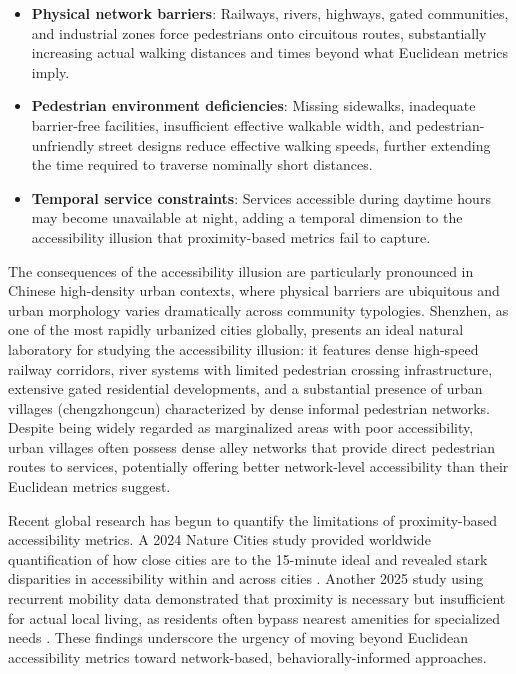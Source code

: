 \documentclass[10pt,conference,compsoc]{IEEEtran}
\begin{document}
\begin{itemize}
    \item \textbf{Physical network barriers}: Railways, rivers, highways, gated communities, and industrial zones force pedestrians onto circuitous routes, substantially increasing actual walking distances and times beyond what Euclidean metrics imply.
    \item \textbf{Pedestrian environment deficiencies}: Missing sidewalks, inadequate barrier-free facilities, insufficient effective walkable width, and pedestrian-unfriendly street designs reduce effective walking speeds, further extending the time required to traverse nominally short distances.
    \item \textbf{Temporal service constraints}: Services accessible during daytime hours may become unavailable at night, adding a temporal dimension to the accessibility illusion that proximity-based metrics fail to capture.
\end{itemize}

The consequences of the accessibility illusion are particularly pronounced in Chinese high-density urban contexts, where physical barriers are ubiquitous and urban morphology varies dramatically across community typologies. Shenzhen, as one of the most rapidly urbanized cities globally, presents an ideal natural laboratory for studying the accessibility illusion: it features dense high-speed railway corridors, river systems with limited pedestrian crossing infrastructure, extensive gated residential developments, and a substantial presence of urban villages (chengzhongcun) characterized by dense informal pedestrian networks. Despite being widely regarded as marginalized areas with poor accessibility, urban villages often possess dense alley networks that provide direct pedestrian routes to services, potentially offering better network-level accessibility than their Euclidean metrics suggest.

Recent global research has begun to quantify the limitations of proximity-based accessibility metrics. A 2024 Nature Cities study provided worldwide quantification of how close cities are to the 15-minute ideal and revealed stark disparities in accessibility within and across cities \cite{bruno2024universal}. Another 2025 study using recurrent mobility data demonstrated that proximity is necessary but insufficient for actual local living, as residents often bypass nearest amenities for specialized needs \cite{recurrent2025}. These findings underscore the urgency of moving beyond Euclidean accessibility metrics toward network-based, behaviorally-informed approaches.
\end{document}
